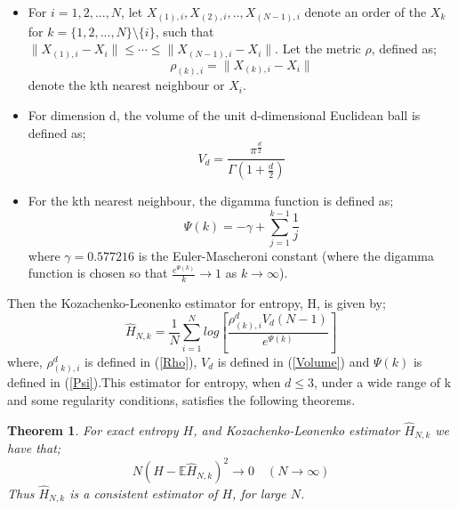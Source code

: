 \documentclass{article}
\newtheorem{theorem}{Theorem}
\begin{document}
\begin{itemize}

\item For $i = 1, 2, ..., N$, let $X_{(1), i}, X_{(2), i}, .., X_{(N-1), i}$ denote an order of the $X_{k}$ for $k = \{1, 2, ..., N\} \setminus \{i\}$, such that $\| X_{(1), i} - X_{i}\| \leq \cdots \leq \|  X_{(N-1), i} - X_{i}\| $. Let the metric $\rho$, defined as;
\begin{equation} \label{Rho}
\rho_{(k), i} = \| X_{(k), i} - X_{i}\|
\end{equation} denote the kth nearest neighbour or $X_{i}$.

\item  For dimension d, the volume of the unit d-dimensional Euclidean ball is defined as;
\begin{equation} \label{Volume}
V_{d} = \frac{\pi^\frac{d}{2}}{\Gamma(1 + \frac{d}{2})}
\end{equation}

\item For the kth nearest neighbour, the digamma function is defined as;
\begin{equation} \label{Psi}
\Psi(k) = -\gamma + \sum_{j=1}^{k-1} \frac{1}{j}
\end{equation}
where $\gamma = 0.577216$ is the Euler-Mascheroni constant (where the digamma function is chosen so that $\frac{e^{\Psi(k)}}{k}\to1$ as $k \to \infty$).

\end{itemize} Then the Kozachenko-Leonenko estimator for entropy, H, is given by;
\begin{equation} \label{KLest}
\hat{H}_{N, k} = \frac{1}{N} \sum_{i=1}^{N} log \left[ \frac{\rho_{(k),i}^{d} V_{d} (N-1)}{e^{\Psi(k)}} \right]
\end{equation} where, $\rho_{(k),i}^{d}$ is defined in (\ref{Rho}), $V_{d}$ is defined in (\ref{Volume}) and $\Psi(k)$ is defined in (\ref{Psi}).This estimator for entropy, when $d \leq 3$, under a wide range of k and some regularity conditions, satisfies the following theorems.

\begin{theorem} \label{consistency_theorem}
For exact entropy $H$, and Kozachenko-Leonenko estimator $\hat{H}_{N,k}$ we have that;
\begin{equation} \label{consistency_equation}
N (H - \mathbb{E}{\hat{H}_{N, k}})^2 \to 0 \quad  (N \to \infty)
\end{equation}
Thus $\hat{H}_{N, k}$ is a consistent estimator of $H$, for large $N$.
\end{theorem}
\end{document}
